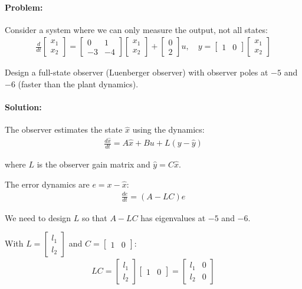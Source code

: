 \documentclass[11pt,a4paper]{article}
\begin{document}
\paragraph{Problem:} Consider a system where we can only measure the output, not all states:
\begin{align}
\frac{d}{dt}\begin{bmatrix} x_1 \\ x_2 \end{bmatrix} = \begin{bmatrix} 0 & 1 \\ -3 & -4 \end{bmatrix}\begin{bmatrix} x_1 \\ x_2 \end{bmatrix} + \begin{bmatrix} 0 \\ 2 \end{bmatrix}u, \quad y = \begin{bmatrix} 1 & 0 \end{bmatrix}\begin{bmatrix} x_1 \\ x_2 \end{bmatrix}
\end{align}

Design a full-state observer (Luenberger observer) with observer poles at $-5$ and $-6$ (faster than the plant dynamics).

\paragraph{Solution:}

The observer estimates the state $\hat{x}$ using the dynamics:
\begin{align}
\frac{d\hat{x}}{dt} = A\hat{x} + Bu + L(y - \hat{y})
\end{align}

where $L$ is the observer gain matrix and $\hat{y} = C\hat{x}$.

The error dynamics are $e = x - \hat{x}$:
\begin{align}
\frac{de}{dt} = (A - LC)e
\end{align}

We need to design $L$ so that $A - LC$ has eigenvalues at $-5$ and $-6$.

With $L = \begin{bmatrix} l_1 \\ l_2 \end{bmatrix}$ and $C = \begin{bmatrix} 1 & 0 \end{bmatrix}$:
\begin{align}
LC = \begin{bmatrix} l_1 \\ l_2 \end{bmatrix}\begin{bmatrix} 1 & 0 \end{bmatrix} = \begin{bmatrix} l_1 & 0 \\ l_2 & 0 \end{bmatrix}
\end{align}
\end{document}
